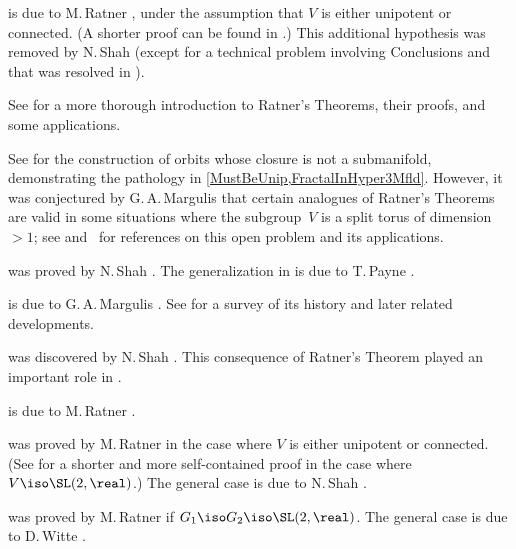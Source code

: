\begin{notes}

 is due to M.\,Ratner \cite{Ratner-OrbitClosure}, under the assumption that $V$ is either unipotent or connected. 
(A shorter proof can be found in \cite{MargulisTomanov-InvtMeas}.)
This additional hypothesis was removed by N.\,Shah \cite{Shah-GenByUnip} (except for a technical problem involving Conclusions  and~ that was resolved in \cite[Cor.~3.5.4]{KleinbockShahStarkov}).

See \cite{Morris-RatnersThms} for a more thorough introduction to Ratner's Theorems, their proofs, and some applications.

See \cite[Lem.~2]{Starkov-StructOrbAndRagConj} for the construction of orbits whose closure is not a submanifold, demonstrating the pathology in \cref{MustBeUnip,FractalInHyper3Mfld}.
However, it was conjectured by G.\,A.\,Margulis \cite[\S1.1]{Margulis-problems} that certain analogues of Ratner's Theorems are valid in some situations where the subgroup~$V$ is a split torus of dimension~$> 1$; see \cite[\S4.4c]{KleinbockShahStarkov} and~\cite{Maucourant-Nonhomog} for references on this open problem and its applications.

 was proved by N.\,Shah \cite{Shah-TotallyGeodesic}. The generalization in  is due to T.\,Payne \cite{Payne-Closures}.

 is due to G.\,A.\,Margulis \cite{Margulis-Oppenheim}.
See \cite{Margulis-OppenheimSurvey} for a survey of its history and later related developments.

 was discovered by N.\,Shah \cite[Cor.~1.5]{Shah-GenByUnip}. This consequence of Ratner's Theorem played an important role in \cite{Vatsal-Heegner}.

 is due to M.\,Ratner \cite{Ratner-OrbitClosure}.

 was proved by M.\,Ratner \cite{Ratner-MeasClass} in the case where $V$ is either unipotent or connected. 
(See \cite{Einsiedler-RatnerSL2R} for a shorter and more self-contained proof in the case where $V \iso \SL(2,\real)$.)
The general case is due to N.\,Shah \cite{Shah-GenByUnip}.

 was proved by M.\,Ratner \cite{Ratner-UnipRigidity} if $G_1 \iso G_2 \iso \SL(2,\real)$. The general case is due to D.\,Witte \cite{Witte-UnipRigidity}.


\end{notes}
